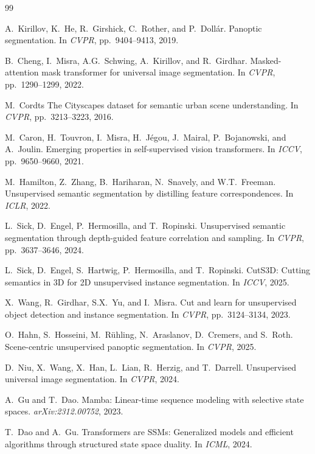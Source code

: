 \documentclass[10pt,twocolumn,letterpaper]{article}
\begin{document}
{\small


\begin{thebibliography}{99}

A.~Kirillov, K.~He, R.~Girshick, C.~Rother, and P.~Doll{\'a}r.
Panoptic segmentation.
In \emph{CVPR}, pp.~9404--9413, 2019.

B.~Cheng, I.~Misra, A.G.~Schwing, A.~Kirillov, and R.~Girdhar.
Masked-attention mask transformer for universal image segmentation.
In \emph{CVPR}, pp.~1290--1299, 2022.

M.~Cordts \etal
The {C}ityscapes dataset for semantic urban scene understanding.
In \emph{CVPR}, pp.~3213--3223, 2016.

M.~Caron, H.~Touvron, I.~Misra, H.~J{\'e}gou, J.~Mairal, P.~Bojanowski, and A.~Joulin.
Emerging properties in self-supervised vision transformers.
In \emph{ICCV}, pp.~9650--9660, 2021.

M.~Hamilton, Z.~Zhang, B.~Hariharan, N.~Snavely, and W.T.~Freeman.
Unsupervised semantic segmentation by distilling feature correspondences.
In \emph{ICLR}, 2022.

L.~Sick, D.~Engel, P.~Hermosilla, and T.~Ropinski.
Unsupervised semantic segmentation through depth-guided feature correlation and sampling.
In \emph{CVPR}, pp.~3637--3646, 2024.

L.~Sick, D.~Engel, S.~Hartwig, P.~Hermosilla, and T.~Ropinski.
{CutS3D}: Cutting semantics in {3D} for {2D} unsupervised instance segmentation.
In \emph{ICCV}, 2025.

X.~Wang, R.~Girdhar, S.X.~Yu, and I.~Misra.
Cut and learn for unsupervised object detection and instance segmentation.
In \emph{CVPR}, pp.~3124--3134, 2023.

O.~Hahn, S.~Hosseini, M.~R{\"u}hling, N.~Araslanov, D.~Cremers, and S.~Roth.
Scene-centric unsupervised panoptic segmentation.
In \emph{CVPR}, 2025.

D.~Niu, X.~Wang, X.~Han, L.~Lian, R.~Herzig, and T.~Darrell.
Unsupervised universal image segmentation.
In \emph{CVPR}, 2024.

A.~Gu and T.~Dao.
Mamba: Linear-time sequence modeling with selective state spaces.
\emph{arXiv:2312.00752}, 2023.

T.~Dao and A.~Gu.
Transformers are {SSMs}: Generalized models and efficient algorithms through structured state space duality.
In \emph{ICML}, 2024.


\end{thebibliography}}
\end{document}
